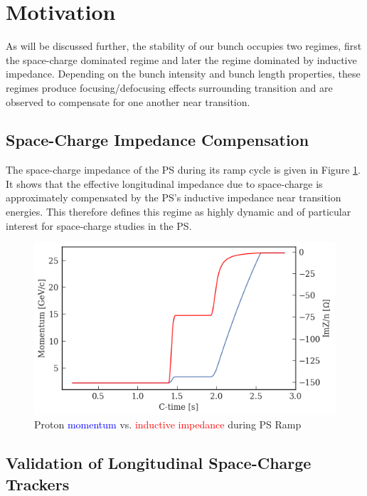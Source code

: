 \section{Motivation}

As will be discussed further, the stability of our bunch occupies two regimes, first the space-charge dominated regime and later the regime dominated by inductive impedance. Depending on the bunch intensity and bunch length properties, these regimes produce focusing/defocusing effects surrounding transition and are observed to compensate for one another near transition.

\subsection{Space-Charge Impedance Compensation}

The space-charge impedance of the PS during its ramp cycle is given in Figure \ref{fig:ps_impedance}. It shows that the effective longitudinal impedance due to space-charge is approximately compensated by the PS's inductive impedance near transition energies. This therefore defines this regime as highly dynamic and of particular interest for space-charge studies in the PS.

\begin{figure}
    \centering
    \includegraphics{figs/energy_v_space_charge_impedance.png}
    \caption{Proton \textcolor{blue}{momentum} vs. \textcolor{red}{inductive impedance} during PS Ramp}
    \label{fig:ps_impedance}
\end{figure}

\subsection{Validation of Longitudinal Space-Charge Trackers}

